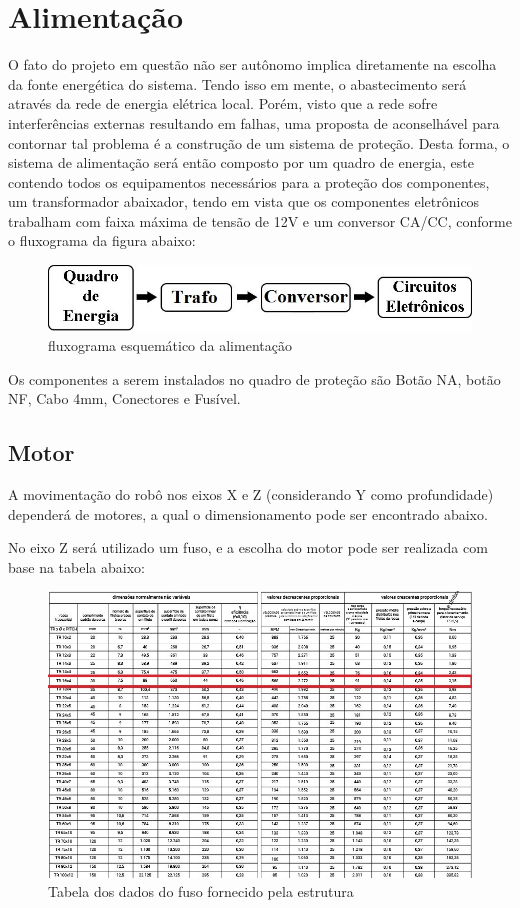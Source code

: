 \chapter[Alimentação]{Alimentação}

O fato do projeto em questão não ser autônomo implica diretamente na escolha da fonte energética do sistema. Tendo isso em mente, o abastecimento será através da rede de energia elétrica local.
Porém, visto que a rede sofre interferências externas resultando em falhas, uma proposta de aconselhável para contornar tal problema é a construção de um sistema de proteção.
Desta forma, o sistema de alimentação será então composto por um quadro de energia, este contendo todos os equipamentos necessários para a proteção dos componentes, um transformador abaixador, tendo em vista que os componentes eletrônicos trabalham com faixa máxima de tensão de 12V e um conversor CA/CC, conforme o fluxograma da figura abaixo: 

\begin{figure}[!h]
\centering
\includegraphics[scale=0.8, angle = 360]{figuras/fluxograma}
\caption[]{fluxograma esquemático da alimentação }
\end{figure}
\FloatBarrier

Os componentes a serem instalados no quadro de proteção são Botão NA, botão NF, Cabo 4mm, Conectores e Fusível.

\section{Motor}
A movimentação do robô nos eixos X e Z (considerando Y como profundidade) dependerá de motores, a qual o dimensionamento pode ser encontrado abaixo.

No eixo Z será utilizado um fuso, e a escolha do motor pode ser realizada com base na tabela abaixo:

\begin{figure}[!h]
\centering
\includegraphics[scale=0.8, angle = 360]{figuras/tabela_escolha_do_motor}
\caption[]{Tabela dos dados do fuso fornecido pela estrutura}
\end{figure}
\FloatBarrier

